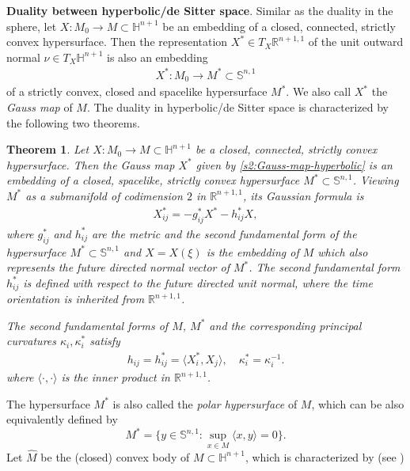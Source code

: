 \documentclass[11pt,reqno]{amsart}
\newtheorem{thm}{Theorem}[section]
\theoremstyle{definition}
\theoremstyle{remark}
\numberwithin{equation}{section}
\renewcommand{\(}{\left(}
\renewcommand{\)}{\right)}
\renewcommand{\~}{\tilde}
\renewcommand{\-}{\overline}
\renewcommand{\k}{\kappa}
\newcommand{\ra}{\rightarrow}
\begin{document}
{\bf Duality between hyperbolic/de Sitter space}.
Similar as the duality in the sphere, let $X:M_0 \ra M \subset \mathbb H^{n+1}$ be an embedding of a closed, connected, strictly convex hypersurface. Then the representation $X^\ast\in T_X \mathbb R^{n+1,1}$ of the unit outward normal $\nu\in T_X \mathbb H^{n+1}$ is also an embedding
\begin{align}\label{s2:Gauss-map-hyperbolic}
X^\ast: M_0 \ra M^\ast \subset \mathbb S^{n,1}
\end{align}
of a strictly convex, closed and spacelike hypersurface $M^\ast$. We also call $X^\ast$ the {\em Gauss map} of $M$. The duality in hyperbolic/de Sitter space is characterized by the following two theorems. 
\begin{thm}\label{s2:thm-duality-hyperbolic-space}\cite[Theorem 10.4.4]{Gerh06}
	Let $X:M_0\ra M \subset \mathbb H^{n+1}$ be a closed, connected, strictly convex hypersurface. Then the Gauss map $X^\ast$ given by \eqref{s2:Gauss-map-hyperbolic} is an embedding of a closed, spacelike, strictly convex hypersurface $M^\ast\subset \mathbb S^{n,1}$. Viewing $M^\ast$ as a submanifold of codimension $2$ in $\mathbb R^{n+1,1}$, its Gaussian formula is 
	\begin{align}\label{s2:Gauss-formula-polar-hyperbolic}
	X^\ast_{ij}=-g^{\ast}_{ij} X^\ast-h^{\ast}_{ij}X,
	\end{align}
	where $g^\ast_{ij}$ and $h^\ast_{ij}$ are the metric and the second fundamental form of the hypersurface $M^\ast \subset \mathbb S^{n,1}$ and $X=X(\xi)$ is the embedding of $M$ which also represents the future directed normal vector of $M^\ast$. The second fundamental form $h^\ast_{ij}$ is defined with respect to the future directed unit normal, where the time orientation is inherited from $\mathbb R^{n+1,1}$. 
	
	The second fundamental forms of $M$, $M^\ast$ and the corresponding principal curvatures $\k_i,\k_i^\ast$ satisfy 
	\begin{align}\label{s2:duality-hyperbolic}
	h_{ij}=h^\ast_{ij}=\langle X^\ast_i,X_j\rangle, \quad \k_i^\ast=\k_i^{-1}.
	\end{align}
	where $\langle \cdot,\cdot\rangle$ is the inner product in $\mathbb R^{n+1,1}$. 
\end{thm}
The hypersurface $M^\ast$ is also called the {\em polar hypersurface} of $M$, which can be also equivalently defined by
$$
M^\ast=\{y\in \mathbb S^{n,1} : \sup_{x\in M}\langle x,y\rangle=0\}.
$$
Let $\hat{M}$ be the (closed) convex body of $M\subset \mathbb H^{n+1}$, which is characterized by (see \cite[Lemma 10.4.1]{Gerh06})
\end{document}
